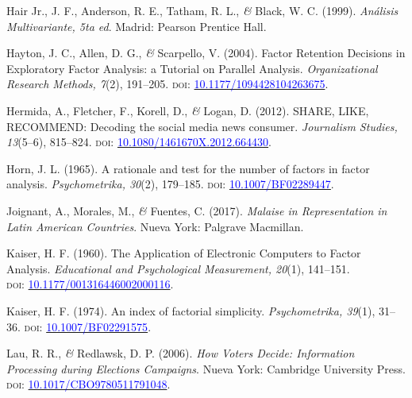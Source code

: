 \documentclass[a4paper]{tufte-handout}
\begin{document}
\begin{list}{}
\item{\small Hair Jr., J. F., Anderson, R. E., Tatham, R. L., {\itshape \&} Black, W. C. (1999). {\itshape Análisis Multivariante, 5ta ed}. Madrid: Pearson Prentice Hall.}

\item{\small Hayton, J. C., Allen, D. G., {\itshape \&} Scarpello, V. (2004). Factor Retention Decisions in Exploratory Factor Analysis: a Tutorial on Parallel Analysis. {\itshape Organizational Research Methods, 7}(2), 191--205. {\scshape doi:} \href{https://doi.org/10.1177/1094428104263675}{\textcolor{blue}{10.1177/1094428104263675}}.}

\item{\small Hermida, A., Fletcher, F., Korell, D., {\itshape \&} Logan, D. (2012). SHARE, LIKE, RECOMMEND: Decoding the social media news consumer. {\itshape Journalism Studies, 13}(5--6), 815--824. {\scshape doi:} \href{https://doi.org/10.1080/1461670X.2012.664430}{\textcolor{blue}{10.1080/1461670X.2012.664430}}.}

\item{\small Horn, J. L. (1965). A rationale and test for the number of factors in factor analysis. {\itshape Psychometrika, 30}(2), 179--185. {\scshape doi:} \href{https://doi.org/10.1007/BF02289447}{\textcolor{blue}{10.1007/BF02289447}}.}

\item{\small Joignant, A., Morales, M., {\itshape \&} Fuentes, C. (2017). {\itshape Malaise in Representation in Latin American Countries}. Nueva York: Palgrave Macmillan.}

\item{\small Kaiser, H. F. (1960). The Application of Electronic Computers to Factor Analysis. {\itshape Educational and Psychological Measurement, 20}(1), 141--151. \\ {\scshape doi:} \href{https://doi.org/10.1177/001316446002000116}{\textcolor{blue}{10.1177/001316446002000116}}.}

\item{\small Kaiser, H. F. (1974). An index of factorial simplicity. {\itshape Psychometrika, 39}(1), 31--36. {\scshape doi:} \href{https://doi.org/10.1007/BF02291575}{\textcolor{blue}{10.1007/BF02291575}}.}

\item{\small Lau, R. R., {\itshape \&} Redlawsk, D. P. (2006). {\itshape How Voters Decide: Information Processing during Elections Campaigns}. Nueva York: Cambridge University Press. {\scshape doi:} \href{https://doi.org/10.1017/CBO9780511791048}{\textcolor{blue}{10.1017/CBO9780511791048}}.}


\end{list}
\end{document}
